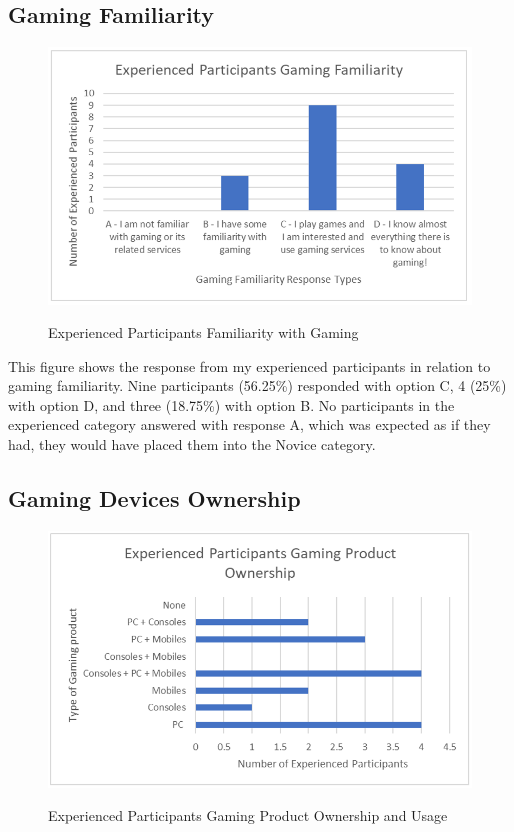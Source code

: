 \subsection{Gaming Familiarity}
\begin{figure}[H]
\includegraphics[width=\linewidth]{Screenshots/DemographicsQuestionaires/experiencedQuestionaireData/experiencedParticipantsGamingFamiliarity.png}
\label{ExperiencedGamingFamiliarity}
\caption{Experienced Participants Familiarity with Gaming}
\end{figure}

This figure shows the response from my experienced participants in relation to gaming familiarity. Nine participants (56.25\%) responded with option C, 4 (25\%) with option D, and three (18.75\%) with option B. No participants in the experienced category answered with response A, which was expected as if they had, they would have placed them into the Novice category.

\subsection{Gaming Devices Ownership}
\begin{figure}[H]
\includegraphics[width=\linewidth]{Screenshots/DemographicsQuestionaires/experiencedQuestionaireData/experiencedGamingOwnership.png}
\label{ExperiencedGamingOwnership}
\caption{Experienced Participants Gaming Product Ownership and Usage}
\end{figure}

